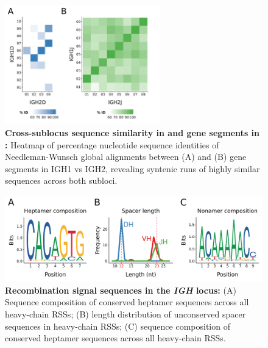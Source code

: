 \begin{figure}
\centering
	\centering
	\begin{subfigure}{0em}
    \label{fig:nfu-dj-alignment-a}
    \end{subfigure}
    \begin{subfigure}{0em}
    \label{fig:nfu-dj-alignment-b}
    \end{subfigure}

\includegraphics[width=0.6\textwidth]{_Figures/png/nfu-dj-aln}
\caption[Cross-sublocus sequence similarity in \dh and \jh gene segments in \Nfu]{\textbf{Cross-sublocus sequence similarity in \dh and \jh gene segments in \Nfu:} Heatmap of percentage nucleotide sequence identities of Needleman-Wunsch global alignments between (A) \dh and (B) \jh gene segments in IGH1 vs IGH2, revealing syntenic runs of highly similar sequences across both subloci.}
\label{fig:nfu-dj-alignment}
\end{figure}	
	
	\begin{figure}
	\centering
	\includegraphics[width=\textwidth]{_Figures/png/nfu-rss-seqlogo-all}
	\caption[Recombination signal sequences in the \Nfu \textit{IGH} locus]{\textbf{Recombination signal sequences in the \Nfu \textit{IGH} locus:} (A) Sequence composition of conserved heptamer sequences across all \Nfu heavy-chain RSSs; (B) length distribution of unconserved spacer sequences in \Nfu heavy-chain RSSs; (C) sequence composition of conserved heptamer sequences across all \Nfu heavy-chain RSSs.}
	\label{fig:nfu-rss-seqlogo-all}
	\end{figure}
	
\FloatBarrier



\clearpage